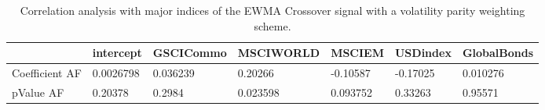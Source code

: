 \begin{table}[H]
\centering
\begin{tabular}{lllllll}
& intercept & GSCICommo & MSCIWORLD & MSCIEM & USDindex & GlobalBonds \\ 
\hline 
Coefficient AF & 0.0026798 & 0.036239 & 0.20266 & -0.10587 & -0.17025 & 0.010276 \\ 
pValue AF & 0.20378 & 0.2984 & 0.023598 & 0.093752 & 0.33263 & 0.95571 \\ 
\hline
\end{tabular}
\caption{Correlation analysis with major indices of the EWMA Crossover signal with a volatility parity weighting scheme.}
\label{MBBSLeverage_AFACTOR}
\end{table}
